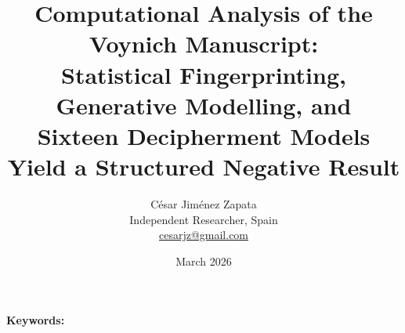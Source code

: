 \documentclass[11pt,a4paper]{article}
\begin{document}
\title{Computational Analysis of the Voynich Manuscript:\\ Statistical Fingerprinting, Generative Modelling, and\\ Sixteen Decipherment Models Yield a Structured Negative Result}

\author{C\'esar Jim\'enez Zapata\\
\small Independent Researcher, Spain\\
\small \href{mailto:cesarjz@gmail.com}{cesarjz@gmail.com}}

\date{March 2026}

\maketitle

\begin{abstract}

\end{abstract}

\noindent\textbf{Keywords:} 





\end{document}
